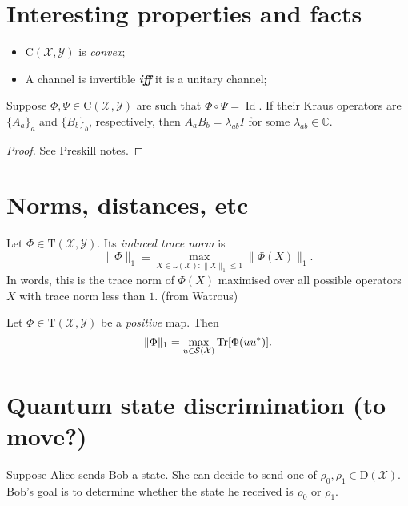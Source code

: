 \documentclass[12pt]{report}
\newcommand{\CC}{\mathbb{C}}
\newcommand{\calY}{{\mathcal{Y}}}
\newcommand{\calS}{{\mathcal{S}}}
\newcommand{\calX}{{\mathcal{X}}}
\newcommand{\rmC}{{\mathrm{C}}}
\newcommand{\rmD}{{\mathrm{D}}}
\newcommand{\rmL}{{\mathrm{L}}}
\newcommand{\rmT}{{\mathrm{T}}}
\DeclareMathOperator{\Id}{Id}
\begin{document}
\section{Interesting properties and facts}

\begin{itemize}
	\item $\rmC(\calX,\calY)$ is \emph{convex};
	\item A channel is invertible \emph{\textbf{iff}} it is a unitary channel;
\end{itemize}

\begin{thm}
	Suppose $\Phi,\Psi\in\rmC(\calX,\calY)$ are such that $\Phi\circ\Psi=\Id$. If their Kraus operators are $\{A_a\}_a$ and $\{B_b\}_b$, respectively, then $A_a B_b=\lambda_{ab} I$ for some $\lambda_{ab}\in\CC$.
\end{thm}
\begin{proof}
	See Preskill notes.
\end{proof}

\section{Norms, distances, etc}

\begin{defn}
	Let $\Phi\in\rmT(\calX,\calY)$. Its \emph{induced trace norm} is
	\begin{equation}
		\|\Phi\|_1 \equiv \max_{X\in\rmL(\calX): \|X\|_1\le 1}\|\Phi(X)\|_1.
	\end{equation}
	In words, this is the trace norm of $\Phi(X)$ maximised over all possible operators $X$ with trace norm less than $1$. (from Watrous)
\end{defn}

\begin{prop}
	Let $\Phi\in\rmT(\calX,\calY)$ be a \emph{positive} map. Then
	\begin{equation}
		\|\Phi\|_1 = \max_{u\in\calS(\calX)}\Tr[\Phi(uu^*)].
	\end{equation}
\end{prop}

\section{Quantum state discrimination (to move?)}

Suppose Alice sends Bob a state. She can decide to send one of $\rho_0,\rho_1\in\rmD(\calX)$. Bob's goal is to determine whether the state he received is $\rho_0$ or $\rho_1$.
\end{document}
